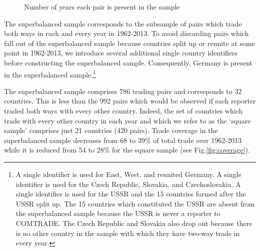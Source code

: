 \documentclass[12pt,twoside,a4paper,notitlepage]{article}
\begin{document}
{%
\begin{figure}[h!]
\begin{center}
\setlength{\fboxrule}{1pt} %
\setlength{\fboxsep}{.1in} %
\end{center}
\caption{Number of years each pair is present in the sample \label{fig:pairpresence}}
\end{figure}

The superbalanced sample corresponds to the subsample of pairs which trade both ways in each and every year in 1962-2013. To avoid discarding pairs which fall out of the superbalanced sample because countries split up or reunite at some point in 1962-2013, we introduce several additional single country identifiers before constructing the superbalanced sample. Consequently, Germany is present in the superbalanced sample.\footnote{A single identifier is used for East, West, and reunited Germany. A single identifier is used for the Czech Republic, Slovakia, and Czechoslovakia. A single identifier is used for the USSR and the 15 countries formed after the USSR split up. The 15 countries which constituted the USSR are absent from the superbalanced sample because the USSR is never a reporter to COMTRADE. The Czech Republic and Slovakia also drop out because there is no other country in the sample with which they have two-way trade in every year.} 

The superbalanced sample comprises 786 trading pairs and corresponds to 32 countries. This is less than the 992 pairs which would be observed if each reporter traded both ways with every other country. Indeed, the set of countries which trade with every other country in each year and which we refer to as the `square sample' comprises just 21 countries (420 pairs). Trade coverage in the superbalanced sample decreases from 68 to 39\% of total trade over 1962-2013 while it is reduced from 54 to 28\% for the square sample (see Fig.\ref{fig:coverage}). 

}
\end{document}
